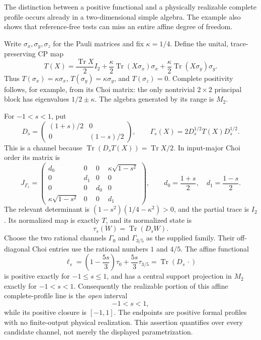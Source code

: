 \documentclass[11pt,a4paper]{article}
\theoremstyle{definition}\newtheorem{definition}[theorem]{Definition}
\newcommand{\Tr}{\operatorname{Tr}}
\begin{document}
The distinction between a positive functional and a physically realizable complete profile occurs already in a two-dimensional simple algebra. The example also shows that reference-free tests can miss an entire affine degree of freedom.

Write $\sigma_x,\sigma_y,\sigma_z$ for the Pauli matrices and fix $\kappa=1/4$. Define the unital, trace-preserving CP map
\begin{equation}\label{eq:qubitT}
 T(X)=\frac{\Tr X}{2}I_2+
       \frac\kappa2\Tr(X\sigma_x)\sigma_x+
       \frac\kappa2\Tr(X\sigma_y)\sigma_y.
\end{equation}
Thus $T(\sigma_x)=\kappa\sigma_x$, $T(\sigma_y)=\kappa\sigma_y$, and $T(\sigma_z)=0$. Complete positivity follows, for example, from its Choi matrix: the only nontrivial $2\times2$ principal block has eigenvalues $1/2\pm\kappa$. The algebra generated by its range is $M_2$.

For $-1<s<1$, put
\begin{equation}\label{eq:qubitfamily}
 D_s=\begin{pmatrix}(1+s)/2&0\\0&(1-s)/2\end{pmatrix},
 \qquad \Gamma_s(X)=2D_s^{1/2}T(X)D_s^{1/2}.
\end{equation}
This is a channel because $\Tr(D_sT(X))=\Tr X/2$. In input-major Choi order its matrix is
\begin{equation}\label{eq:qubitch}
 J_{\Gamma_s}=\begin{pmatrix}
 d_0&0&0&\kappa\sqrt{1-s^2}\\
 0&d_1&0&0\\
 0&0&d_0&0\\
 \kappa\sqrt{1-s^2}&0&0&d_1
 \end{pmatrix},\qquad d_0=\frac{1+s}{2},\quad d_1=\frac{1-s}{2}.
\end{equation}
The relevant determinant is $(1-s^2)(1/4-\kappa^2)>0$, and the partial trace is $I_2$. Its normalized map is exactly $T$, and its normalized state is
\[
 \tau_s(W)=\Tr(D_sW).
\]
Choose the two rational channels $\Gamma_0$ and $\Gamma_{3/5}$ as the supplied family. Their off-diagonal Choi entries use the rational numbers $1$ and $4/5$. The affine functional
\begin{equation}\label{eq:qubitweights}
 \ell_s=\left(1-\frac{5s}{3}\right)\tau_0+
              \frac{5s}{3}\tau_{3/5}
       =\Tr(D_s\,\cdot)
\end{equation}
is positive exactly for $-1\le s\le1$, and has a central support projection in $M_2$ exactly for $-1<s<1$. Consequently the realizable portion of this affine complete-profile line is the \emph{open} interval
\[
 -1<s<1,
\]
while its positive closure is $[-1,1]$. The endpoints are positive formal profiles with no finite-output physical realization. This assertion quantifies over every candidate channel, not merely the displayed parametrization.
\end{document}
